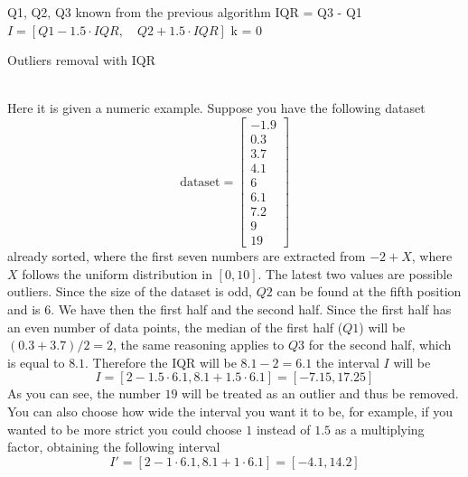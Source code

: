 \documentclass[12pt,twoside]{report}
\begin{document}
\begin{algorithm}[H]
\SetAlgoLined
{}
Q1, Q2, Q3 known from the previous algorithm\;
IQR = Q3 - Q1\;
$I=[Q1-1.5\cdot IQR,\quad Q2 + 1.5\cdot IQR]$\;
k = 0\;
 \caption{Outliers removal with IQR}
\end{algorithm}
\noindent \\Here it is given a numeric example. Suppose you have the following dataset 
$$
\text{dataset}=\begin{bmatrix}
-1.9\\ 
0.3\\ 
3.7\\
4.1\\
6\\
6.1\\
7.2\\
9\\
19
\end{bmatrix}
$$
already sorted, where the first seven numbers are extracted from $-2+X$, where $X$ follows the uniform distribution in $[0,10]$. The latest two values are possible outliers. Since the size of the dataset is odd, $Q2$ can be found at the fifth position and is $6$. We have then the first half and the second half. Since the first half has an even number of data points, the median of the first half ($Q1$) will be $(0.3+3.7)/2=2$, the same reasoning applies to $Q3$ for the second half, which is equal to $8.1$. Therefore the IQR will be $8.1-2=6.1$ the interval $I$ will be
$$I=[2-1.5\cdot6.1,8.1+1.5\cdot6.1]=[-7.15,17.25]$$
As you can see, the number $19$ will be treated as an outlier and thus be removed. You can also choose how wide the interval you want it to be, for example, if you wanted to be more strict you could choose $1$ instead of $1.5$ as a multiplying factor, obtaining the following interval
$$I'=[2-1\cdot6.1,8.1+1\cdot6.1]=[-4.1,14.2]$$
\end{document}
